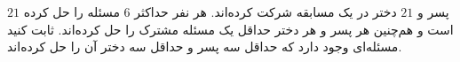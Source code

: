 \EXERCISE
$21$
پسر و
$21$
دختر در یک مسابقه شرکت کرده‌اند. هر نفر حداکثر
$6$
مسئله را حل کرده است و هم‌چنین هر پسر و هر دختر حداقل یک مسئله مشترک را حل کرده‌اند. ثابت کنید مسئله‌ای وجود دارد که حداقل سه پسر و حداقل سه دختر آن را حل کرده‌اند.